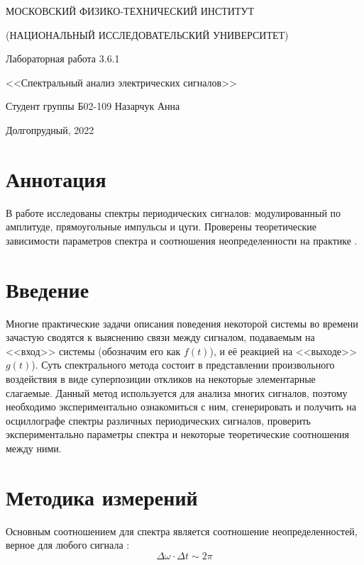 \documentclass[a4paper,12pt]{article} %
\begin{document}
\begin{titlepage}

\thispagestyle{empty}

\centerline{МОСКОВСКИЙ ФИЗИКО-ТЕХНИЧЕСКИЙ ИНСТИТУТ}
\centerline{(НАЦИОНАЛЬНЫЙ ИССЛЕДОВАТЕЛЬСКИЙ УНИВЕРСИТЕТ)}

\vfill

\centerline{\huge{Лабораторная работа 3.6.1}}
\centerline{\LARGE{<<Спектральный анализ электрических сигналов>>}}

\vfill

Студент группы Б02-109 \hfill Назарчук Анна

\vfill

\centerline{Долгопрудный, 2022}
\clearpage
\end{titlepage} 
\section{Аннотация}
В работе исследованы спектры периодических сигналов: модулированный по амплитуде, прямоугольные импульсы и цуги. Проверены теоретические зависимости параметров спектра и соотношения неопределенности на практике .


\section{Введение}
Многие практические задачи описания поведения некоторой системы во времени зачастую сводятся к выяснению связи между сигналом, подаваемым на <<вход>>
системы (обозначим его как $f(t)$), и её реакцией на <<выходе>> $g(t)$). Суть спектрального метода состоит в представлении произвольного воздействия в виде суперпозиции откликов на некоторые элементарные слагаемые. Данный метод используется для анализа многих сигналов, поэтому необходимо экспериментально ознакомиться с ним, сгенерировать и получить на осциллографе спектры различных периодических сигналов, проверить экспериментально параметры спектра и некоторые теоретические соотношения между ними.

\section{Методика измерений}
Основным соотношением для спектра является соотношение неопределенностей, верное для любого сигнала \cite{labnik}:
\begin{equation}
\Delta \omega \cdot \Delta t \sim 2\pi
\end{equation}
\end{document}
